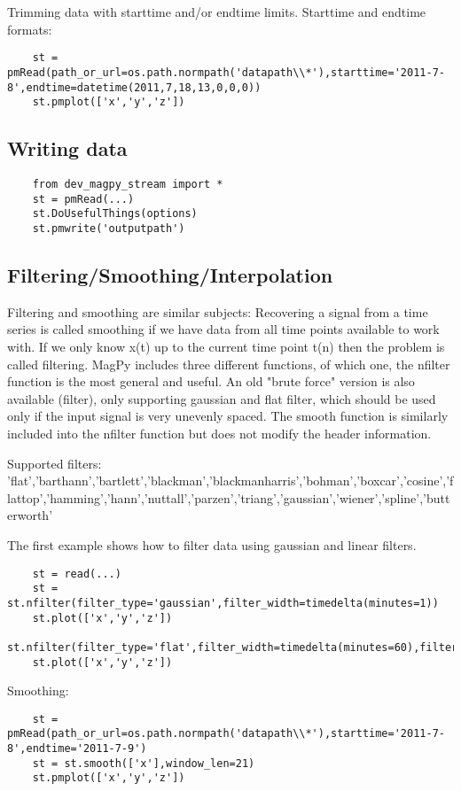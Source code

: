 Trimming data with starttime and/or endtime limits. Starttime and endtime formats:
\begin{verbatim}
    st = pmRead(path_or_url=os.path.normpath('datapath\\*'),starttime='2011-7-8',endtime=datetime(2011,7,18,13,0,0,0))
    st.pmplot(['x','y','z'])
\end{verbatim}

\subsection{Writing data}

\begin{verbatim}
    from dev_magpy_stream import *
    st = pmRead(...)
    st.DoUsefulThings(options)
    st.pmwrite('outputpath')
\end{verbatim}

\subsection{Filtering/Smoothing/Interpolation}

Filtering and smoothing are similar subjects: Recovering a signal from a time series is called smoothing if we have data from all time points available to work with. If we only know x(t) up to the current time point t(n) then the problem is called filtering. MagPy includes three different functions, of which one, the nfilter function is the most general and useful. An old "brute force" version is also available (filter), only supporting gaussian and flat filter, which should be used only if the input signal is very unevenly spaced. The smooth function is similarly included into the nfilter function but does not modify the header information.
   
Supported filters:
'flat','barthann','bartlett','blackman','blackmanharris','bohman','boxcar','cosine','flattop','hamming','hann','nuttall','parzen','triang','gaussian','wiener','spline','butterworth'


The first example shows how to filter data using gaussian and linear filters.
\begin{verbatim}
    st = read(...)
    st = st.nfilter(filter_type='gaussian',filter_width=timedelta(minutes=1))
    st.plot(['x','y','z'])
    st.nfilter(filter_type='flat',filter_width=timedelta(minutes=60),filter_offset=timedelta(minutes=30))
    st.plot(['x','y','z'])
\end{verbatim}

Smoothing:
\begin{verbatim}
    st = pmRead(path_or_url=os.path.normpath('datapath\\*'),starttime='2011-7-8',endtime='2011-7-9')
    st = st.smooth(['x'],window_len=21)
    st.pmplot(['x','y','z'])
\end{verbatim}

